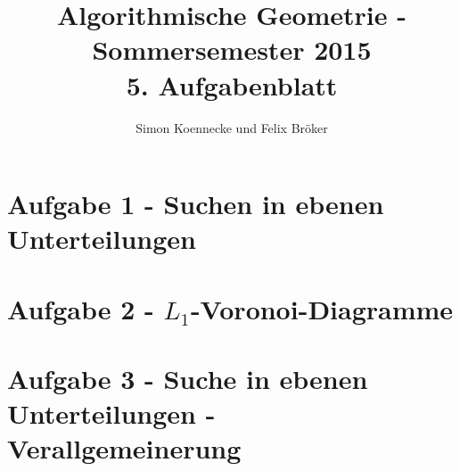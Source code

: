 \documentclass[a4paper]{article}
\begin{document}
\title{Algorithmische Geometrie - Sommersemester 2015\\
       5. Aufgabenblatt }
\author{Simon Koennecke und Felix Bröker}
\date{}
\maketitle

\section*{Aufgabe 1 - Suchen in ebenen Unterteilungen}

\section*{Aufgabe 2 - $L_1$-Voronoi-Diagramme}

\section*{Aufgabe 3 - Suche in ebenen Unterteilungen - Verallgemeinerung}
\end{document}
